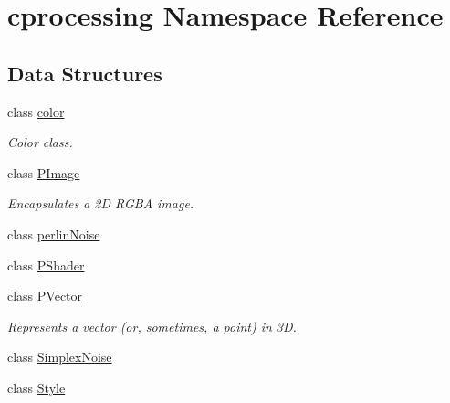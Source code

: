 \hypertarget{namespacecprocessing}{\section{cprocessing \-Namespace \-Reference}
\label{namespacecprocessing}
}
\subsection*{\-Data \-Structures}
\begin{DoxyCompactItemize}
\item 
class \hyperlink{classcprocessing_1_1color}{color}
\begin{DoxyCompactList}\small\item\em \-Color class. \end{DoxyCompactList}\item 
class \hyperlink{classcprocessing_1_1PImage}{\-P\-Image}
\begin{DoxyCompactList}\small\item\em \-Encapsulates a 2\-D \-R\-G\-B\-A image. \end{DoxyCompactList}\item 
class \hyperlink{classcprocessing_1_1perlinNoise}{perlin\-Noise}
\item 
class \hyperlink{classcprocessing_1_1PShader}{\-P\-Shader}
\item 
class \hyperlink{classcprocessing_1_1PVector}{\-P\-Vector}
\begin{DoxyCompactList}\small\item\em \-Represents a vector (or, sometimes, a point) in 3\-D. \end{DoxyCompactList}\item 
class \hyperlink{classcprocessing_1_1SimplexNoise}{\-Simplex\-Noise}
\item 
class \hyperlink{classcprocessing_1_1Style}{\-Style}
\end{DoxyCompactItemize}
